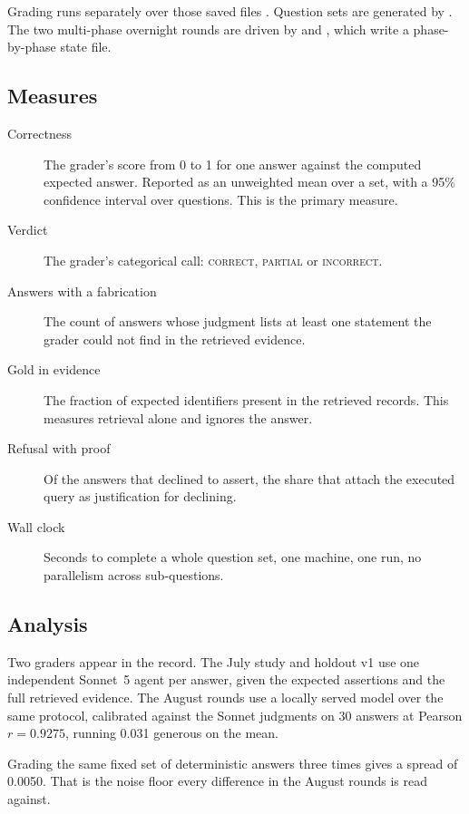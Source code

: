 Grading runs separately over those saved files
. Question sets are generated by
. The two multi-phase overnight
rounds are driven by  and
, which write a phase-by-phase state file.

\subsection{Measures}

\begin{description}
  \item[Correctness] The grader's score from 0 to 1 for one answer against the
    computed expected answer. Reported as an unweighted mean over a set, with a
    95\% confidence interval over questions. This is the primary measure.
  \item[Verdict] The grader's categorical call: \textsc{correct},
    \textsc{partial} or \textsc{incorrect}.
  \item[Answers with a fabrication] The count of answers whose judgment lists at
    least one statement the grader could not find in the retrieved evidence.
  \item[Gold in evidence] The fraction of expected identifiers present in the
    retrieved records. This measures retrieval alone and ignores the answer.
  \item[Refusal with proof] Of the answers that declined to assert, the share
    that attach the executed query as justification for declining.
  \item[Wall clock] Seconds to complete a whole question set, one machine, one
    run, no parallelism across sub-questions.
\end{description}

\subsection{Analysis}

Two graders appear in the record. The July study and holdout v1 use one
independent Sonnet~5 agent per answer, given the expected assertions and the
full retrieved evidence. The August rounds use a locally served model
 over the same protocol, calibrated against
the Sonnet judgments on 30 answers at Pearson $r = 0.9275$, running 0.031
generous on the mean.

Grading the same fixed set of deterministic answers three times gives a spread
of 0.0050. That is the noise floor every difference in the August rounds is read
against.

